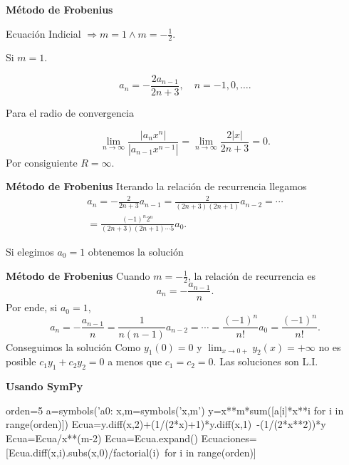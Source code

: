 \begin{frame}[fragile]{\textbf{Método de Frobenius}}




Ecuación Indicial $\Rightarrow m=1 \wedge m=-\frac12$. 

Si $m=1$.

\[
a_{n}=-\frac{2a_{n-1}}{2n+3},\quad n=-1,0,\ldots.
\]

Para el radio de convergencia

\[\lim_{n\to\infty}\frac{|a_{n}x^{n}|}{|a_{n-1}x^{n-1}|}=
\lim_{n\to\infty}\frac{2|x|}{2n+3}=0.\]
Por consiguiente $R=\infty$.  
\end{frame}




\begin{frame}[fragile]{\textbf{Método de Frobenius}}
Iterando la relación de recurrencia llegamos
\begin{multline*}
 a_{n}=-\frac{2}{2n+3}a_{n-1}=\frac{2}{(2n+3)(2n+1)}a_{n-2}=\cdots\\
 =
\frac{(-1)^n2^{n}}{(2n+3)(2n+1)\cdots 5}a_0.
\end{multline*}

Si elegimos $a_0=1$ obtenemos la solución
\end{frame}




\begin{frame}[fragile]{\textbf{Método de Frobenius}}
Cuando $m=-\frac12$, la relación de recurrencia es
\[a_{n}=-\frac{a_{n-1}}{n}.\]
Por ende, si $a_0=1$,
\[a_n=-\frac{a_{n-1}}{n}=\frac{1}{n(n-1)}a_{n-2}=\cdots=\frac{(-1)^n}{n!}a_{0}=\frac{(-1)^n}{n!}.\]
Conseguimos la solución
Como $y_1(0)=0$ y $\lim_{x\to 0+}y_2(x)=+\infty$ no es posible $c_1y_1+c_2y_2=0$ a menos que $c_1=c_2=0$. Las soluciones son L.I.




\end{frame}







\begin{frame}[fragile]{\textbf{Usando SymPy}}


\begin{sympyblock}[][numbers=left,frame=single,framesep=5mm]
orden=5
a=symbols('a0:%
x,m=symbols('x,m')
y=x**m*sum([a[i]*x**i for i in range(orden)])
Ecua=y.diff(x,2)+(1/(2*x)+1)*y.diff(x,1)\
    -(1/(2*x**2))*y
Ecua=Ecua/x**(m-2)
Ecua=Ecua.expand()
Ecuaciones=[Ecua.diff(x,i).subs(x,0)/factorial(i)\
    for i in range(orden)]
\end{sympyblock}
\end{frame}



